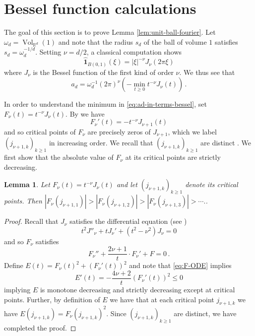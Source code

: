 \documentclass[10pt]{amsart}
\newtheorem{lemma}[theorem]{Lemma}
\theoremstyle{definition}
\theoremstyle{remark}
\newcommand{\Vol}{\operatorname{Vol}}
\newcommand{\R}{\mathbb{R}}
\begin{document}
	
	
	
	
	
	
	\appendix
	
	\section{Bessel function calculations} \label{sec:bessel}
	The goal of this section is to prove Lemma \ref{lem:unit-ball-fourier}.   Let $\omega_d = \Vol_{\R^d}(1)$ and note that the radius $s_d$ of the ball of volume $1$ satisfies $s_d = \omega_d^{-1/d}$.   Setting $\nu = d/2$, a classical computation \cite[Appendix B.5]{grakaos2014classical} shows $$\widehat{\boldsymbol{1}}_{B(0,1)}(\xi) = |\xi|^{-\nu} J_{\nu}(2\pi \xi)$$
	where $J_\nu$ is the Bessel function of the first kind of order $\nu$. We thus see that \begin{equation}\label{eq:ad-in-terms-bessel}
		a_d = \omega_d^{-1} (2\pi)^\nu \left(- \min_{t \geq 0} t^{-\nu} J_\nu(t)  \right)\,.
	\end{equation}
	
	In order to understand the minimum in \eqref{eq:ad-in-terms-bessel},  set $F_\nu(t) = t^{-\nu} J_{\nu}(t)$.  By \cite[Eq.~10.6.6]{handook2010} we have 
	\begin{equation}
		F_\nu'(t) = - t^{-\nu} J_{\nu+1}(t)
	\end{equation}
	and so critical points of $F_\nu$ are precisely zeros of $J_{\nu+1}$, which we label $(j_{\nu+1,k})_{k \geq 1}$ in increasing order.  We recall that $(j_{\nu+1,k})_{k \geq 1}$ are distinct \cite[Sec.~10.21(i)]{handook2010}.  We first show that the absolute value of $F_\nu$ at its critical points are strictly decreasing.
	
	\begin{lemma}\label{lem:crit-points-bessel-decreasing}
		Let $F_\nu(t) = t^{-\nu} J_{\nu}(t)$ and let $(j_{\nu+1,k})_{k \geq 1}$ denote its critical points.  Then $|F_\nu(j_{\nu+1,1})| > |F_\nu(j_{\nu+1,2})| > |F_\nu(j_{\nu+1,3})| > \cdots . $.
	\end{lemma}
	\begin{proof}
		Recall that $J_\nu$ satisfies the differential equation (see \cite[Eq.~10.13.4]{handook2010})\begin{equation*} t^2 J''_\nu + t J_\nu' + (t^2 - \nu^2)J_\nu = 0
		\end{equation*}
		and so $F_\nu$ satisfies \begin{equation}\label{eq:F-ODE}
			F_\nu'' + \frac{2\nu + 1}{t} \cdot F_\nu' + F = 0\,.
		\end{equation}
		Define $E(t) = F_\nu(t)^2 + (F_\nu'(t))^2$ and note that \eqref{eq:F-ODE} implies $$E'(t) = -\frac{4\nu + 2}{t} (F_\nu'(t))^2 \leq 0$$
		implying $E$ is monotone decreasing and strictly decreasing except at critical points.  Further, by definition of $E$ we have that at each critical point $j_{\nu+1,k}$ we have $E(j_{\nu+1,k}) = F_\nu(j_{\nu+1,k})^2$.  Since $(j_{\nu+1,k})_{k \geq 1}$ are distinct, we have completed the proof.
	\end{proof}
	
\end{document}
